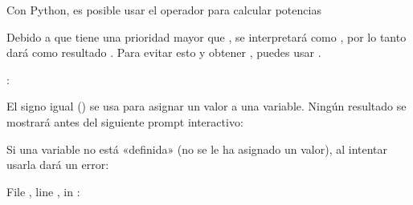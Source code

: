 \documentclass[a5paper,10pt,spanish]{sphinxmanual}
\begin{document}
\sphinxAtStartPar
Con Python, es posible usar el operador \sphinxcode{\sphinxupquote{**}} para calcular potencias %
\begin{footnote}[1]\sphinxAtStartFootnote
Debido a que \sphinxcode{\sphinxupquote{**}} tiene una prioridad mayor que ,  se interpretará como , por lo tanto dará como resultado . Para evitar esto y obtener , puedes usar .
%
\end{footnote}:

\begin{sphinxVerbatim}[commandchars=\\\{\}]
    
    
\end{sphinxVerbatim}

\sphinxAtStartPar
El signo igual (\sphinxcode{\sphinxupquote{=}}) se usa para asignar un valor a una variable. Ningún resultado se mostrará antes del siguiente prompt interactivo:

\begin{sphinxVerbatim}[commandchars=\\\{\}]
  
    
  
\end{sphinxVerbatim}

\sphinxAtStartPar
Si una variable no está «definida» (no se le ha asignado un valor), al intentar usarla dará un error:

\begin{sphinxVerbatim}[commandchars=\\\{\}]
  
  File , line , in 
: 
\end{sphinxVerbatim}
\end{document}
